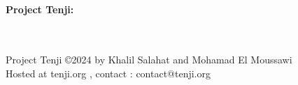 
    \begin{titlepage}
        \begin{center}
            \vspace*{5cm}
            \Huge
            \HRule \\[0.4cm]
            \textbf{Project Tenji: \\ \TITLE}\\
            \Large 
            \HRule \\[1.5cm]
            \vspace{2cm}
            \vfill
        \end{center}
        \vfill
        { \scriptsize Project Tenji \copyright 2024 by Khalil Salahat and Mohamad El Moussawi  \\}
        { \scriptsize Hosted at tenji.org , contact : contact@tenji.org \\}
        { \scriptsize \NOTICEE  \\}
    \end{titlepage} 
    \tableofcontents
{}